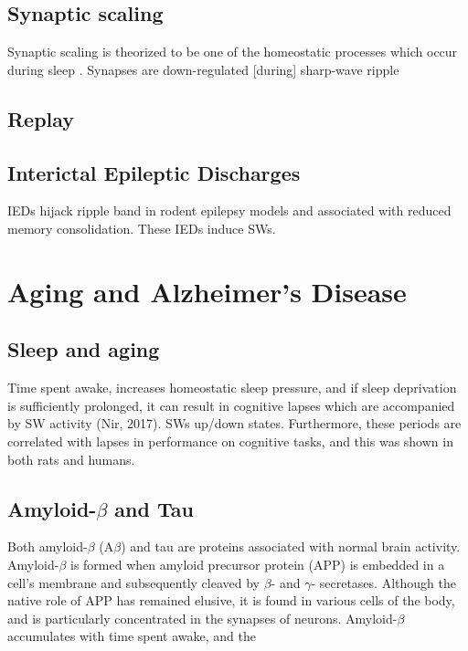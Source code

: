 \subsection*{Synaptic scaling}
Synaptic scaling is theorized to be one of the homeostatic processes which occur during sleep \citep{Tononi2003}. Synapses are down-regulated [during] sharp-wave ripple 

\subsection*{Replay}

\subsection*{Interictal Epileptic Discharges}
IEDs hijack ripple band in rodent epilepsy models and associated with reduced memory consolidation. These IEDs induce SWs.

\section*{Aging and Alzheimer's Disease}
\subsection*{Sleep and aging}
Time spent awake, increases homeostatic sleep pressure, and if sleep deprivation is sufficiently prolonged, it can result in cognitive lapses which are accompanied by SW activity (Nir, 2017). SWs up/down states. Furthermore, these periods are correlated with lapses in performance on cognitive tasks, and this was shown in both rats and humans. 

\subsection*{Amyloid-$\beta$ and Tau}
Both amyloid-$\beta$ (A$\beta$) and tau are proteins associated with normal brain activity. Amyloid-$\beta$ is formed when amyloid precursor protein (APP) is embedded in a cell's membrane and subsequently cleaved by $\beta$- and $\gamma$- secretases. Although the native role of APP has remained elusive, it is found in various cells of the body, and is particularly concentrated in the synapses of neurons. Amyloid-$\beta$ accumulates with time spent awake, and the 

